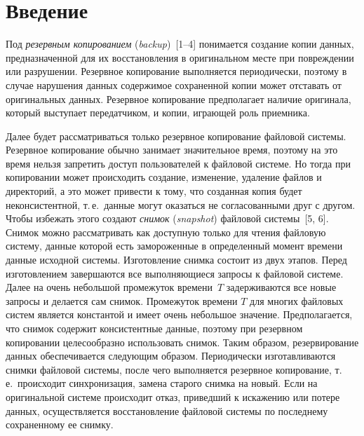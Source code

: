       \begin{multicols}{2}

      \label{st\stat}

\section{Введение}

      Под \textit{резервным копированием} (\textit{backup})~[1--4] понимается 
создание копии данных, предназначенной для их восстановления в 
оригинальном месте при повреждении или разрушении. Резервное копирование 
выполняется периодически,  поэтому в случае нарушения данных содержимое 
сохраненной копии может отставать от оригинальных данных.  Резервное 
копирование предполагает наличие оригинала, который выступает 
передатчиком, и копии, играющей роль приемника. 
      
      Далее будет рассматриваться только резервное копирование файловой 
системы.  Резервное копирование обычно занимает значительное время, 
поэтому на это время нельзя запретить доступ пользователей к файловой 
системе. Но тогда при копировании может происходить создание, изменение, 
удаление файлов и директорий, а это может привести к тому, что созданная 
копия будет неконсистентной, т.\,е.\ данные могут оказаться не 
согласованными друг с другом. Чтобы избежать этого создают \textit{снимок} 
(\textit{snapshot}) файловой системы~[5, 6]. Снимок можно рассматривать как 
доступную только для чтения файловую систему, данные которой есть 
замороженные в определенный момент времени данные исходной системы. 
Изготовление снимка состоит из двух этапов. Перед изготовлением 
завершаются все выполняющиеся запросы к файловой системе. Далее на очень 
небольшой промежуток времени~$T$ задерживаются все новые запросы и 
делается сам снимок. Промежуток времени $T$ для многих файловых сис\-тем является константой и 
имеет очень небольшое значение. Предполагается, что снимок содержит 
консистентные данные, поэтому при резервном копировании целесообразно 
использовать снимок. Таким образом, резервирование данных обеспечивается 
следующим образом. Периодически из\-го\-тав\-ли\-ва\-ют\-ся снимки файловой 
сис\-те\-мы, после чего выполняется резервное копирование, т.\,е.\ происходит 
синхронизация, замена старого снимка на новый. Если на оригинальной 
сис\-те\-ме происходит отказ, приведший к искажению или потере данных, 
осуществляется восстановление файловой системы по последнему 
сохраненному ее снимку.
      

\end{multicols}
